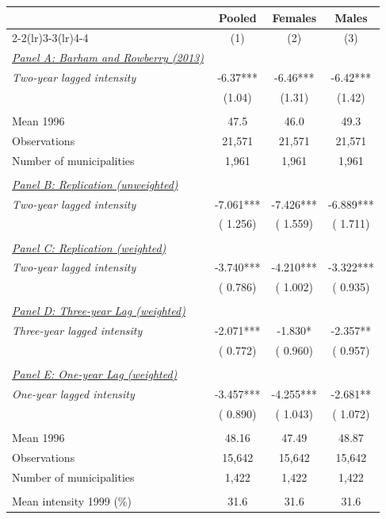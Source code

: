 \begin{tabular}{lccc} \hline \hline
& \multicolumn{1}{c}{Pooled} & \multicolumn{1}{c}{Females} & \multicolumn{1}{c}{Males} \\ 
\cmidrule(lr){2-2}\cmidrule(lr){3-3}\cmidrule(lr){4-4}  
& \multicolumn{1}{c}{(1)} & \multicolumn{1}{c}{(2)} & \multicolumn{1}{c}{(3)} \\ \toprule 
\underline{\textit{Panel A: Barham and Rowberry (2013)}}  \\ 
\textit{Two-year lagged intensity} & -6.37*** & -6.46*** & -6.42*** \\ 
 & (1.04) & (1.31) & (1.42) \\ 
  & & & \\ 
Mean 1996 & 47.5 & 46.0 & 49.3 \\ 
Observations & 21,571 & 21,571 & 21,571 \\ 
Number of municipalities & 1,961 & 1,961 & 1,961 \\ 
  & & & \\ 
\underline{\textit{Panel B: Replication (unweighted)}}  \\ 
\textit{Two-year lagged intensity} &       -7.061*** &       -7.426*** &       -6.889*** \\ 
 & (       1.256) & (       1.559) & (       1.711) \\ 
  & & & \\ 
\underline{\textit{Panel C: Replication (weighted)}}  \\ 
\textit{Two-year lagged intensity} &       -3.740*** &       -4.210*** &       -3.322*** \\ 
 & (       0.786) & (       1.002) & (       0.935) \\ 
  & & & \\ 
\underline{\textit{Panel D: Three-year Lag (weighted)}}  \\ 
\textit{Three-year lagged intensity} &       -2.071*** &       -1.830* &       -2.357** \\ 
 & (       0.772) & (       0.960) & (       0.957) \\ 
  & & & \\ 
\underline{\textit{Panel E: One-year Lag (weighted)}}  \\ 
\textit{One-year lagged intensity} &       -3.457*** &       -4.255*** &       -2.681** \\ 
 & (       0.890) & (       1.043) & (       1.072) \\ 
  & & & \\ 
Mean 1996 &        48.16 &        47.49 &        48.87 \\ 
Observations &       15,642 &       15,642 &       15,642 \\ 
Number of municipalities &        1,422 &        1,422 &        1,422 \\ 
  & & & \\ 
Mean intensity 1999 (\%) &   31.6 &   31.6 &   31.6 \\ 
\bottomrule
\end{tabular}